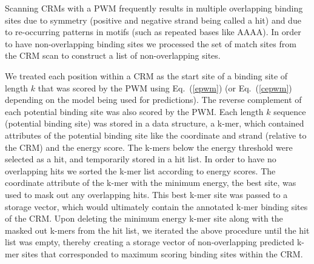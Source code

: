 Scanning CRMs with a PWM frequently results in multiple overlapping binding sites due to symmetry (positive and negative strand being called a hit) and due to re-occurring patterns in motifs (such as repeated bases like AAAA).  In order to have non-overlapping binding sites we processed the set of match sites from the CRM scan to construct a list of non-overlapping sites.  
	  
We treated each position within a CRM as the start site of a binding site of length $k$ that was scored by the PWM using Eq.~(\ref{epwm}) (or Eq.~(\ref{cepwm}) depending on the model being used for predictions).  The reverse complement of each potential binding site was also scored by the PWM.  Each length $k$ sequence (potential binding site) was stored in a data structure, a k-mer, which contained attributes of the potential binding site like the coordinate and strand (relative to the CRM) and the energy score.  The k-mers below the energy threshold were selected as a hit, and temporarily stored in a hit list.  In order to have no overlapping hits we sorted the k-mer list according to energy scores.  The coordinate attribute of the k-mer with the minimum energy, the best site, was used to mask out any overlapping hits.  This best k-mer site was passed to a storage vector, which would ultimately contain the annotated k-mer binding sites of the CRM.  Upon deleting the minimum energy k-mer site along with the masked out k-mers from the hit list, we iterated the above procedure until the hit list was empty, thereby creating a storage vector of non-overlapping predicted k-mer sites that corresponded to maximum scoring binding sites within the CRM.
	
